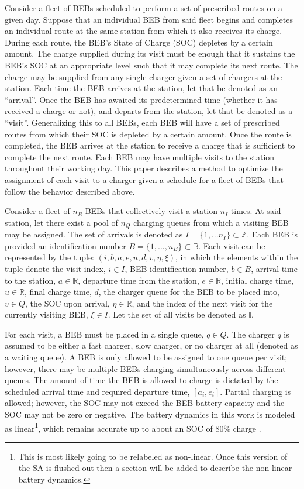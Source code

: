 \documentclass[11pt,a4paper,final]{article}
\newcommand{\visit}{(i, b, a, e, u, d, v, \eta, \xi)}
\newcommand{\I}{\mathbb{I}}                 %
\newcommand{\Iset}{I}                       %
\newcommand{\Qset}{Q}                       %
\begin{document}
Consider a fleet of BEBs scheduled to perform a set of prescribed routes on a given day. Suppose that an individual BEB
from said fleet begins and completes an individual route at the same station from which it also receives its charge.
During each route, the BEB's State of Charge (SOC) depletes by a certain amount. The charge supplied during its visit
must be enough that it sustains the BEB's SOC at an appropriate level such that it may complete its next route. The
charge may be supplied from any single charger given a set of chargers at the station. Each time the BEB arrives at the
station, let that be denoted as an ``arrival''. Once the BEB has awaited its predetermined time (whether it has received a
charge or not), and departs from the station, let that be denoted as a ``visit''. Generalizing this to all BEBs, each BEB
will have a set of prescribed routes from which their SOC is depleted by a certain amount. Once the route is completed,
the BEB arrives at the station to receive a charge that is sufficient to complete the next route. Each BEB may have
multiple visits to the station throughout their working day. This paper describes a method to optimize the assignment of
each visit to a charger given a schedule for a fleet of BEBs that follow the behavior described above.

Consider a fleet of \(n_B\) BEBs that collectively visit a station \(n_I\) times. At said station, let there exist a pool of
\(n_Q\) charging queues from which a visiting BEB may be assigned. The set of arrivals is denoted as \(\Iset = \{ 1, ...
n_I \} \subset \mathbb{Z}\). Each BEB is provided an identification number \(B = \{ 1, ..., n_B \} \subset \mathbb{B}\). Each visit can be
represented by the tuple: \(\visit\), in which the elements within the tuple denote the visit index, \(i \in I\), BEB
identification number, \(b \in B\), arrival time to the station, \(a \in \mathbb{R}\), departure time from the station, \(e \in \mathbb{R}\), initial
charge time, \(u \in \mathbb{R}\), final charge time, \(d\), the charger queue for the BEB to be placed into, \(v \in Q\), the SOC upon
arrival, \(\eta \in \mathbb{R}\), and the index of the next visit for the currently visiting BEB, \(\xi \in I\). Let the set of all visits be
denoted as \(\I\).

For each visit, a BEB must be placed in a single queue, \(q \in \Qset\). The charger \(q\) is assumed to be either a fast
charger, slow charger, or no charger at all (denoted as a waiting queue). A BEB is only allowed to be assigned to one
queue per visit; however, there may be multiple BEBs charging simultaneously across different queues. The amount of time
the BEB is allowed to charge is dictated by the scheduled arrival time and required departure time, \([a_i, e_i]\).
Partial charging is allowed; however, the SOC may not exceed the BEB battery capacity and the SOC may not be zero or
negative. The battery dynamics in this work is modeled as linear\footnote{This is most likely going to be relabeled as non-linear. Once this version of the SA is flushed out then a
section will be added to describe the non-linear battery dynamics.}, which remains accurate up to about an SOC of 80\%
charge \cite{li-2016-batter-elect}.
\end{document}
